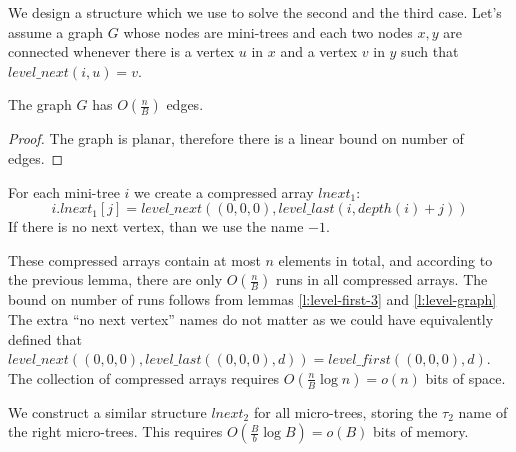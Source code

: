 We design a structure which we use to solve the second and the third case.
Let's assume a graph $G$ whose nodes are mini-trees and each two nodes $x, y$ are connected whenever there is a vertex $u$ in $x$ and a vertex $v$ in $y$ such that $level\_next(i, u) = v$.

\begin{lemma}\label{l:level-graph}
	The graph $G$ has $O(\frac{n}{B})$ edges.
\end{lemma}
\begin{proof}
	The graph is planar, therefore there is a linear bound on number of edges.
\end{proof}

For each mini-tree $i$ we create a compressed array $lnext_1$:
$$i.lnext_1[j] = level\_next((0, 0, 0), level\_last(i, depth(i) + j))$$
If there is no next vertex, than we use the name $-1$.

These compressed arrays contain at most $n$ elements in total, and according to the previous lemma, there are only $O(\frac{n}{B})$ runs in all compressed arrays.
The bound on number of runs follows from lemmas \ref{l:level-first-3} and \ref{l:level-graph}
The extra ``no next vertex'' names do not matter as we could have equivalently defined that $level\_next((0, 0, 0), level\_last((0, 0, 0), d)) = level\_first((0, 0, 0), d)$.
The collection of compressed arrays requires $O(\frac{n}{B} \log n) = o(n)$ bits of space.

We construct a similar structure $lnext_2$ for all micro-trees, storing the $\tau_2$ name of the right micro-trees.
This requires $O(\frac{B}{b} \log B) = o(B)$ bits of memory.

